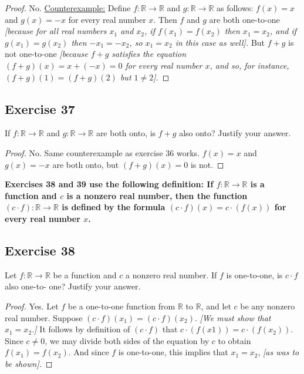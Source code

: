 \documentclass[14pt]{extarticle}
\newcommand{\R}{\mathbb{R}}
\newcommand{\cy}{\color{cyan}}
\begin{document}
\begin{proof}
No. \underline{Counterexample:} Define \(f: \R \to \R\) and \(g: \R \to \R\) as follows: \(f(x) = x\) and \(g(x) = -x\) 
for every real number $x$. Then $f$ and $g$ are both one-to-one {\it [because for all real numbers $x_1$ and $x_2$, 
if \(f(x_1) = f(x_2)\) then \(x_1 = x_2\), and if \(g(x_1) = g(x_2)\) then \(-x_1 = -x_2\), so \(x_1 = x_2\) in this 
case as well].} But \(f + g\) is not one-to-one {\it [because $f + g$ satisfies the equation \((f + g)(x) = x + 
(-x) = 0\) for every real number $x$, and so, for instance, \((f + g)(1) = (f + g)(2)\) but $1 \neq 2$].}
\end{proof}

\subsection{Exercise 37}
If \(f: \R \to \R\) and \(g: \R \to \R\) are both onto, is \(f + g\) also onto? Justify your answer.

\begin{proof}
No. Same counterexample as exercise 36 works. \(f(x) = x\) and \(g(x) = -x\) are both onto, but \((f+g)(x) = 0\) is not.
\end{proof}

{\bf \cy Exercises 38 and 39 use the following definition: If \(f: \R \to \R\) is a function and $c$ is a nonzero real 
number, then the function \((c \cdot f): \R \to \R\) is defined by the formula \((c \cdot f)(x) = c \cdot (f(x))\) 
for every real number $x$.}

\subsection{Exercise 38}
Let \(f: \R \to \R\) be a function and $c$ a nonzero real number. If $f$ is one-to-one, is \(c \cdot f\) also one-to-
one? Justify your answer.

\begin{proof}
Yes. Let $f$ be a one-to-one function from $\R$ to $\R$, and let $c$ be any nonzero real number. Suppose 
\((c \cdot f)(x_1) = (c \cdot f)(x_2)\). {\it [We must show that \(x_1 = x_2\).]} It follows by definition of 
\((c \cdot f)\) that \(c \cdot (f(x1)) = c \cdot (f(x_2))\). Since \(c \neq 0\), we may divide both sides of the 
equation by $c$ to obtain \(f(x_1) = f(x_2)\). And since $f$ is one-to-one, this implies that \(x_1 = x_2\), 
{\it [as was to be shown].}
\end{proof}
\end{document}

